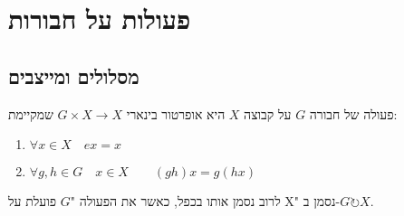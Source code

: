 \documentclass{tstextbook}
\begin{document}
\chapter{פעולות על חבורות}

\section{מסלולים ומייצבים}

\begin{definition}
פעולה של חבורה \(G\) על קבוצה \(X\) היא אופרטור בינארי \(G\times X\to X\) שמקיימת:

\end{definition}
\begin{enumerate}
  \item \(\forall x \in X\quad ex=x\)


  \item \(\forall g,h \in G \quad x \in X \qquad (gh)x=g(hx)\)


\end{enumerate}
לרוב נסמן אותו בכפל, כאשר את הפעולה "\(G\) פועלת על X" נסמן ב-\(G\circlearrowright X\).
\end{document}
